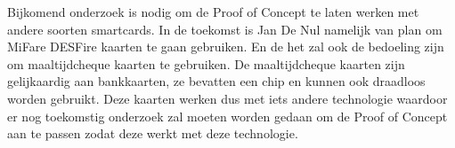 \documentclass[a0,portrait]{hogent-poster}
\begin{document}
\begin{multicols}{2}
Bijkomend onderzoek is nodig om de Proof of Concept te laten werken met andere soorten smartcards. In de toekomst is Jan De Nul namelijk van plan om MiFare DESFire kaarten te gaan gebruiken. En de het zal ook de bedoeling zijn om maaltijdcheque kaarten te gebruiken. De maaltijdcheque kaarten zijn gelijkaardig aan bankkaarten, ze bevatten een chip en kunnen ook draadloos worden gebruikt. Deze kaarten werken dus met iets andere technologie waardoor er nog toekomstig onderzoek zal moeten worden gedaan om de Proof of Concept aan te passen zodat deze werkt met deze technologie.

\end{multicols}
\end{document}
